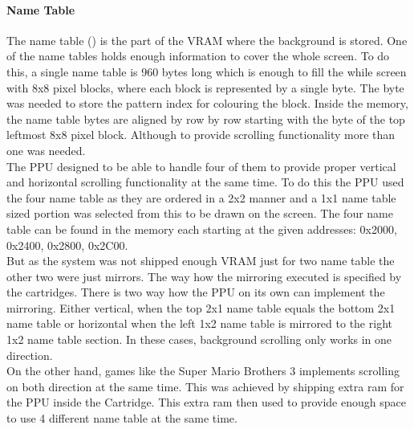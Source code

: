 \documentclass[]{report}
\begin{document}
\paragraph{Name Table}
The name table (\cite{NMTB}) is the part of the VRAM where the background is stored. One of the name tables holds enough information to cover the whole screen. To do this, a single name table is 960 bytes long which is enough to fill the while screen with 8x8 pixel blocks, where each block is represented by a single byte. The byte was needed to store the pattern index for colouring the block. Inside the memory, the name table bytes are aligned by row by row starting with the byte of the top leftmost 8x8 pixel block. Although to provide scrolling functionality more than one was needed. 
\\
The PPU designed to be able to handle four of them to provide proper vertical and horizontal scrolling functionality at the same time. To do this the PPU used the four name table as they are ordered in a 2x2 manner and a 1x1 name table sized portion was selected from this to be drawn on the screen.
The four name table can be found in the memory each starting at the given addresses: 0x2000, 0x2400, 0x2800, 0x2C00.
\\
But as the system was not shipped enough VRAM just for two name table the other two were just mirrors. The way how the mirroring executed is specified by the cartridges. There is two way how the PPU on its own can implement the mirroring. Either vertical, when the top 2x1 name table equals the bottom 2x1 name table or horizontal when the left 1x2 name table is mirrored to the right 1x2 name table section. In these cases, background scrolling only works in one direction.
\\
On the other hand, games like the Super Mario Brothers 3 implements scrolling on both direction at the same time. This was achieved by shipping extra ram for the PPU inside the Cartridge. This extra ram then used to provide enough space to use 4 different name table at the same time.
\end{document}
